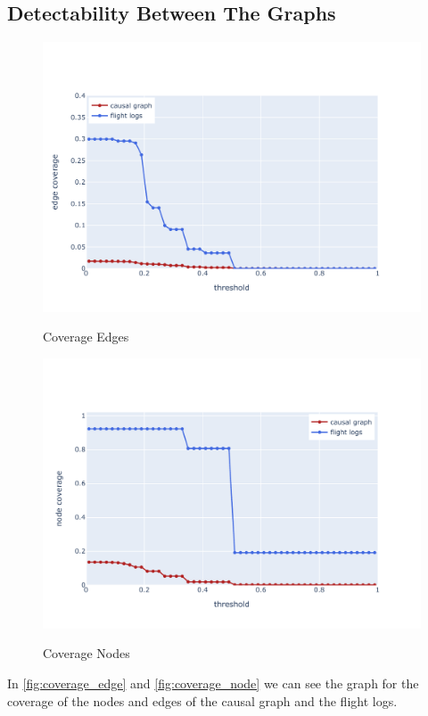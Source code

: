 \subsection{Detectability Between The Graphs}\label{subsec:coverage-question}
\begin{figure}
    \begin{center}
        \includegraphics[scale=.65]{figures/results/edge_coverage}
        \caption{Coverage Edges}\label{fig:coverage_edge}
        \includegraphics[scale=.65]{figures/results/node_coverage}
        \caption{Coverage Nodes}\label{fig:coverage_node}
    \end{center}
\end{figure}
In \autoref{fig:coverage_edge} and \autoref{fig:coverage_node} we can see the graph for the coverage of the nodes and edges of the causal graph and the flight logs.
